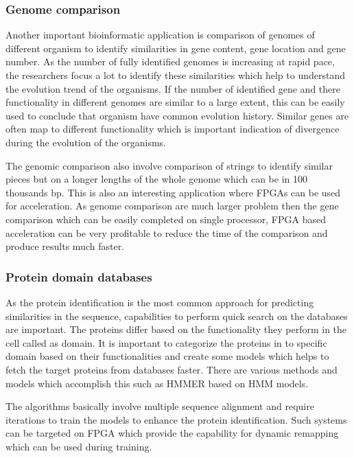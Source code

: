 \documentclass[12pt,twoside]{article}
\begin{document}
\subsubsection{Genome comparison}

Another important bioinformatic application is comparison of genomes of different organism to identify similarities
in gene content, gene location and gene number. As the number of fully identified genomes is increasing at rapid pace,
the researchers focus a lot to identify these similarities which help to understand the evolution trend of the organisms.
If the number of identified gene and there functionality in different genomes are similar to a large extent, this can be
easily used to conclude that organism have common evolution history. Similar genes are often map to different functionality
which is important indication of divergence during the evolution of the organisms. 

The genomic comparison also involve comparison of strings to identify similar pieces but on a longer lengths of the whole
genome which can be in 100 thousands bp. This is also an interesting application where FPGAs can be used for acceleration.
As genome comparison are much larger problem then the gene comparison which can be easily completed on single processor,
FPGA based acceleration can be very profitable to reduce the time of the comparison and produce results much faster.

\subsubsection{Protein domain databases}

As the protein identification is the most common approach for predicting similarities in the sequence, capabilities
to perform quick search on the databases are important. The proteins differ based on the functionality they perform in
the cell called as domain. It is important to categorize the proteins in to specific domain based on their functionalities
and create some models which helps to fetch the target proteins from databases faster. There are various methods and models
which accomplish this such as HMMER based on HMM models.

The algorithms basically involve multiple sequence alignment and require iterations to train the models to enhance
the protein identification. Such systems can be targeted on FPGA which provide the capability for dynamic remapping
which can be used during training.
\end{document}
